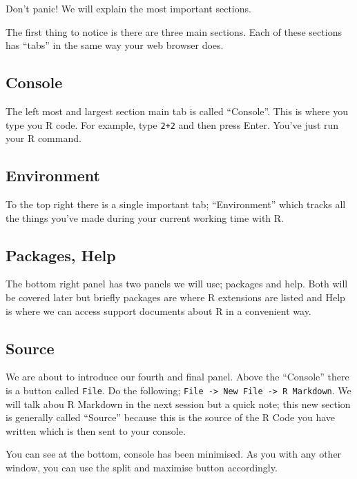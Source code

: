 \documentclass[]{book}
\begin{document}
Don't panic! We will explain the most important sections.

The first thing to notice is there are three main sections. Each of these sections has ``tabs'' in the same way your web browser does.

\hypertarget{console}{%
\subsection{Console}\label{console}}

The left most and largest section main tab is called ``Console''. This is where you type you R code. For example, type \texttt{2+2} and then press Enter. You've just run your R command.

\hypertarget{environment}{%
\subsection{Environment}\label{environment}}

To the top right there is a single important tab; ``Environment'' which tracks all the things you've made during your current working time with R.

\hypertarget{packages-help}{%
\subsection{Packages, Help}\label{packages-help}}

The bottom right panel has two panels we will use; packages and help. Both will be covered later but briefly packages are where R extensions are listed and Help is where we can access support documents about R in a convenient way.

\hypertarget{source}{%
\subsection{Source}\label{source}}

We are about to introduce our fourth and final panel. Above the ``Console'' there is a button called \texttt{File}. Do the following; \texttt{File\ -\textgreater{}\ New\ File\ -\textgreater{}\ R\ Markdown}. We will talk abou R Markdown in the next session but a quick note; this new section is generally called ``Source'' because this is the source of the R Code you have written which is then sent to your console.

You can see at the bottom, console has been minimised. As you with any other window, you can use the split and maximise button accordingly.
\end{document}
